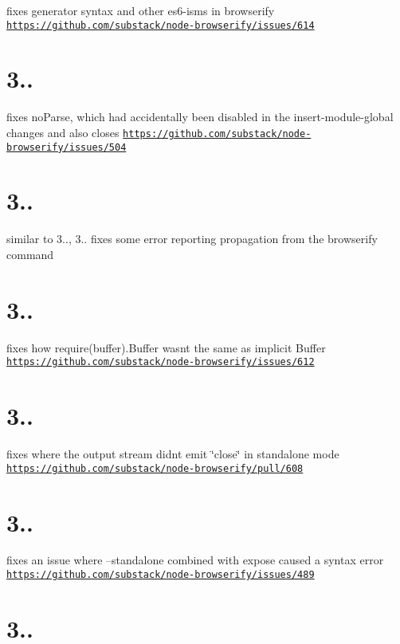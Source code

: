 fixes generator syntax and other es6-\/isms in browserify \href{https://github.com/substack/node-browserify/issues/614}{\tt https\+://github.\+com/substack/node-\/browserify/issues/614}

\section*{3..}

fixes no\+Parse, which had accidentally been disabled in the insert-\/module-\/global changes and also closes \href{https://github.com/substack/node-browserify/issues/504}{\tt https\+://github.\+com/substack/node-\/browserify/issues/504}

\section*{3..}

similar to 3.., 3.. fixes some error reporting propagation from the browserify command

\section*{3..}

fixes how require(\textquotesingle{}buffer\textquotesingle{}).Buffer wasn\textquotesingle{}t the same as implicit Buffer \href{https://github.com/substack/node-browserify/issues/612}{\tt https\+://github.\+com/substack/node-\/browserify/issues/612}

\section*{3..}

fixes where the output stream didn\textquotesingle{}t emit \char`\"{}close\char`\"{} in standalone mode \href{https://github.com/substack/node-browserify/pull/608}{\tt https\+://github.\+com/substack/node-\/browserify/pull/608}

\section*{3..}

fixes an issue where --standalone combined with expose caused a syntax error \href{https://github.com/substack/node-browserify/issues/489}{\tt https\+://github.\+com/substack/node-\/browserify/issues/489}

\section*{3..}

